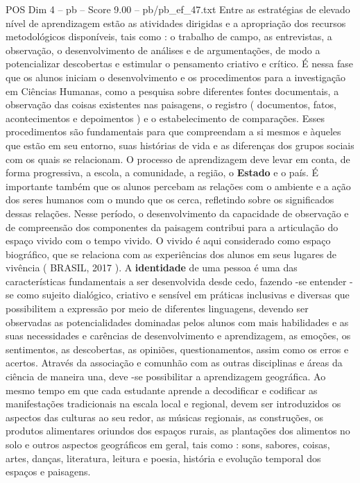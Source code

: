 \begin{textsample}{POS Dim 4 – pb – Score 9.00 – pb/pb\_ef\_47.txt}
Entre as estratégias de elevado nível de aprendizagem estão as atividades dirigidas e a apropriação dos recursos metodológicos disponíveis, tais como : o trabalho de campo, as entrevistas, a observação, o desenvolvimento de análises e de argumentações, de modo a potencializar descobertas e estimular o pensamento criativo e crítico.
É nessa fase que os alunos iniciam o desenvolvimento e os procedimentos para a investigação em Ciências Humanas, como a pesquisa sobre diferentes fontes documentais, a observação das coisas existentes nas paisagens, o registro ( documentos, fatos, acontecimentos e depoimentos ) e o estabelecimento de comparações.
Esses procedimentos são fundamentais para que compreendam a si mesmos e àqueles que estão em seu entorno, suas histórias de vida e as diferenças dos grupos sociais com os quais se relacionam.
O processo de aprendizagem deve levar em conta, de forma progressiva, a escola, a comunidade, a região, o \textbf{Estado} e o país.
É importante também que os alunos percebam as relações com o ambiente e a ação dos seres humanos com o mundo que os cerca, refletindo sobre os significados dessas relações.
Nesse período, o desenvolvimento da capacidade de observação e de compreensão dos componentes da paisagem contribui para a articulação do espaço vivido com o tempo vivido.
O vivido é aqui considerado como espaço biográfico, que se relaciona com as experiências dos alunos em seus lugares de vivência ( BRASIL, 2017 ).
A \textbf{identidade} de uma pessoa é uma das características fundamentais a ser desenvolvida desde cedo, fazendo -se entender -se como sujeito dialógico, criativo e sensível em práticas inclusivas e diversas que possibilitem a expressão por meio de diferentes linguagens, devendo ser observadas as potencialidades dominadas pelos alunos com mais habilidades e as suas necessidades e carências de desenvolvimento e aprendizagem, as emoções, os sentimentos, as descobertas, as opiniões, questionamentos, assim como os erros e acertos.
Através da associação e comunhão com as outras disciplinas e áreas da ciência de maneira una, deve -se possibilitar a aprendizagem geográfica.
Ao mesmo tempo em que cada estudante aprende a decodificar e codificar as manifestações tradicionais na escala local e regional, devem ser introduzidos os aspectos das culturas ao seu redor, as músicas regionais, as construções, os produtos alimentares oriundos dos espaços rurais, as plantações dos alimentos no solo e outros aspectos geográficos em geral, tais como : sons, sabores, coisas, artes, danças, literatura, leitura e poesia, história e evolução temporal dos espaços e paisagens.

\end{textsample}
